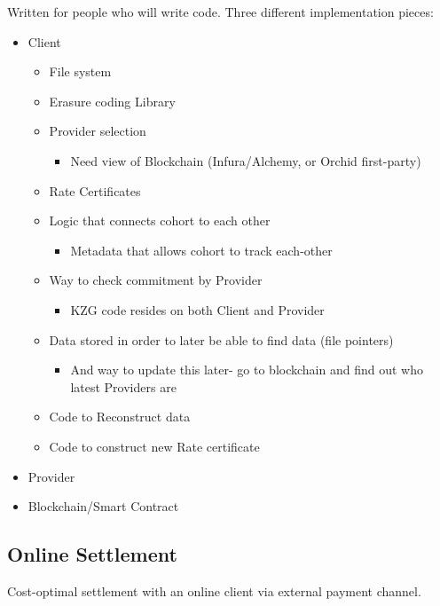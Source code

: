 \documentclass{article}
\begin{document}
Written for people who will write code. Three different implementation pieces: 
\begin{itemize}
    \item Client
    \begin{itemize}
        \item File system
        \item Erasure coding Library
        \item Provider selection
        \begin{itemize}
            \item Need view of Blockchain (Infura/Alchemy, or Orchid first-party)
        \end{itemize}
        \item Rate Certificates
        \item Logic that connects cohort to each other
        \begin{itemize}
            \item Metadata that allows cohort to track each-other
        \end{itemize}
        \item Way to check commitment by Provider
        \begin{itemize}
            \item KZG code resides on both Client and Provider
        \end{itemize}
        \item Data stored in order to later be able to find data (file pointers)
        \begin{itemize}
            \item And way to update this later- go to blockchain and find out who latest Providers are
        \end{itemize}
        \item Code to Reconstruct data
        \item Code to construct new Rate certificate
    \end{itemize}
\item Provider
\item Blockchain/Smart Contract
\end{itemize}


\subsection{Online Settlement}

Cost-optimal settlement with an online client via external payment channel.
\end{document}
